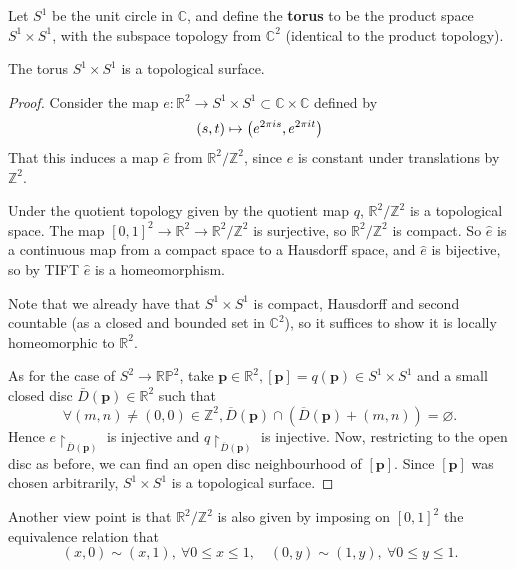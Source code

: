 \documentclass[a4paper]{article}
\begin{document}
\begin{example}
	Let \( S^1 \) be the unit circle in \( \mathbb C \), and define the \textbf{torus} to be the product space \( S^1 \times S^1 \), with the subspace topology from \( \mathbb C^2 \) (identical to the product topology).
	\begin{lemma}
		The torus $ S^1 \times S^1 $ is a topological surface.
	\end{lemma}
	\begin{proof}
		Consider the map \( e \colon \mathbb R^2 \to S^1 \times S^1 \subset \mathbb{C} \times \mathbb{C} \) defined by
		\[
			(s,t) \mapsto \qty(e^{2\pi i s}, e^{2 \pi i t})
		\]
		That this induces a map \( \hat e \) from \( {\mathbb R^2}/{\mathbb Z^2} \), since \( e \) is constant under translations by \( \mathbb Z^2 \).
		\begin{center}
		\end{center}
		Under the quotient topology given by the quotient map \( q \), \( {\mathbb R^2}/{\mathbb Z^2} \) is a topological space.
		The map \( [0,1]^2 \to \mathbb R^2 \to {\mathbb R^2}/{\mathbb Z^2} \) is surjective, so \( {\mathbb R^2}/{\mathbb Z^2} \) is compact.
		So \( \hat e \) is a continuous map from a compact space to a Hausdorff space, and \( \hat e \) is bijective, so by TIFT \( \hat e \) is a homeomorphism.

		Note that we already have that \( S^1 \times S^1 \) is compact, Hausdorff and second countable (as a closed and bounded set in \( \mathbb C^2 \)), so it suffices to show it is locally homeomorphic to \( \mathbb R^2 \).

		As for the case of $S^2\to \mathbb{R}\mathbb{P}^2$, take $\mathbf p\in \mathbb{R}^2, [\mathbf p]= q(\mathbf p)\in S^1\times S^1 $ and a small closed disc $ \bar{D}(\mathbf p)\in \mathbb{R}^2 $ such that 
		\[
			\forall	 (m,n)\neq (0,0)\in \mathbb{Z}^2, \overline{D}(\mathbf p) \cap (\overline{D}(\mathbf p)+(m,n)) = \varnothing. 
		\]
		Hence \( e\restriction_{\overline D(\mathbf p)} \) is injective and \( q\restriction_{\overline D(\mathbf p)} \) is injective.
		Now, restricting to the open disc as before, we can find an open disc neighbourhood of \( [\mathbf p] \).
		Since \( [\mathbf p] \) was chosen arbitrarily, \( S^1 \times S^1 \) is a topological surface.
	\end{proof}
	Another view point is that $ \mathbb{R}^{2}/\mathbb{Z}^2 $ is also given by imposing on $[0,1]^2$ the equivalence relation that 
\[
	(x,0) \sim (x,1),\ \forall 0\le x\le 1,\quad (0,y) \sim (1,y),\ \forall 0\le y\le 1.
\]
\begin{center}
\end{center}
\end{example}
\end{document}
